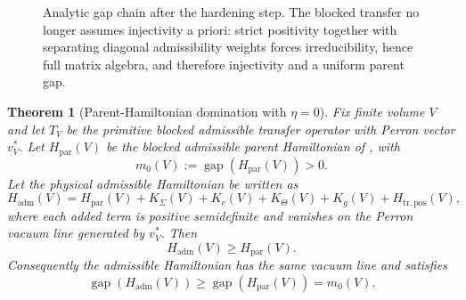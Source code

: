 \documentclass[11pt,a4paper]{article}
\newtheorem{theorem}{Theorem}[section]
\theoremstyle{definition}
\theoremstyle{remark}
\begin{document}
\begin{figure}[t]
\centering
\scriptsize
{}
\caption{Analytic gap chain after the hardening step. The blocked transfer no longer assumes
injectivity a priori: strict positivity together with separating diagonal admissibility weights
forces irreducibility, hence full matrix algebra, and therefore injectivity and a uniform parent
gap.}
\label{fig:gap-hardening-chain}
\end{figure}

\begin{theorem}[Parent-Hamiltonian domination with \texorpdfstring{$\eta=0$}{eta=0}]
\label{lem:norm-stable-gap-parent-path}
\label{thm:eta-zero-parent-domination}
Fix finite volume $V$ and let $T_V$ be the primitive blocked admissible transfer operator with
Perron vector $v_V^\ast$. Let $H_{\mathrm{par}}(V)$ be the blocked admissible parent Hamiltonian of
, with
\[
m_0(V):=\operatorname{gap}(H_{\mathrm{par}}(V))>0.
\]
Let the physical admissible Hamiltonian be written as
\[
H_{\mathrm{adm}}(V)
=
H_{\mathrm{par}}(V)+K_\Sigma(V)+K_c(V)+K_\Theta(V)+K_g(V)+H_{\mathrm{tr,pos}}(V),
\]
where each added term is positive semidefinite and vanishes on the Perron vacuum line generated by
$v_V^\ast$. Then
\[
H_{\mathrm{adm}}(V)\ge H_{\mathrm{par}}(V).
\]
Consequently the admissible Hamiltonian has the same vacuum line and satisfies
\[
\operatorname{gap}(H_{\mathrm{adm}}(V))
\ge
\operatorname{gap}(H_{\mathrm{par}}(V))
=
m_0(V).
\]
\end{theorem}
\end{document}
